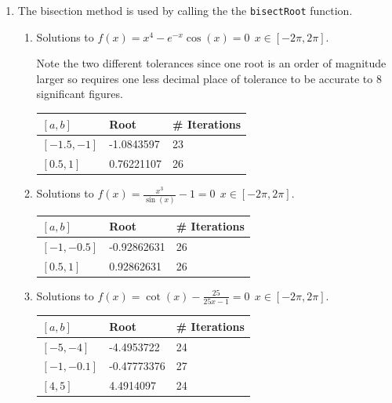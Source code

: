 \documentclass[a4paper,11pt]{article}
\begin{document}
\begin{enumerate}
	\item The bisection method is used by calling the the \verb*|bisectRoot| 
	function.
	
	
	
	\begin{enumerate}
		\item Solutions to $f(x) = x^{4} - e^{-x} \cos(x) = 0 \  \ 
		x\in[-2\pi,2\pi]$.
		
		Note the two different tolerances since one root is an order of 
		magnitude larger so requires one less decimal place of tolerance to 
		be 
		accurate to 8 significant figures.
		\begin{center}
			\begin{tabular}{l|ll}
				$[a,b]$     & Root       & \# Iterations \\ \hline
				$[-1.5,-1]$ & -1.0843597 & 23           \\
				$[0.5,1]$   & 0.76221107 & 26          
			\end{tabular}
		\end{center}
		
	
	
		\item Solutions to $f(x) = \frac{x^{3}}{\sin(x)} - 1 = 0 \  \ 
		x\in[-2\pi,2\pi]$.
		
		\begin{center}
			\begin{tabular}{l|ll}
				$[a,b]$     & Root        & \# Iterations \\ \hline
				$[-1,-0.5]$ & -0.92862631 & 26            \\
				$[0.5,1]$   & 0.92862631  & 26           
			\end{tabular}
		\end{center}
	
	
		\item Solutions to $f(x) = \cot(x)	- \frac{25}{25x-1} = 0 \  \ 
		x\in[-2\pi,2\pi]$.
		
		\begin{center}
			\begin{tabular}{l|ll}
				$[a,b]$     & Root        & \# Iterations \\ \hline
				$[-5,-4]$   & -4.4953722  & 24            \\
				$[-1,-0.1]$ & -0.47773376 & 27            \\
				$[4,5]$     & 4.4914097   & 24           
			\end{tabular}
		\end{center}
		

\end{enumerate}
\end{enumerate}
\end{document}
